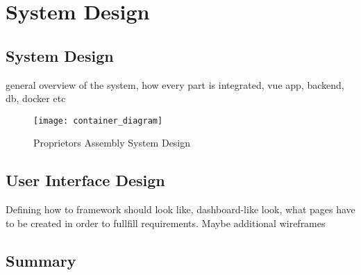 \chapter[System Design]{System Design}

\section{System Design}
general overview of the system, how every part is integrated, vue app, backend, db, docker etc

\begin{figure}[H]
    \begin{center}
    \texttt{[image: container\_diagram]}
    \end{center}
    \caption{Proprietors Assembly System Design}
    \label{fig:usecases}
\end{figure}

\section{User Interface Design}
Defining how to framework should look like, dashboard-like look, what pages have to be created in order to fullfill requirements. Maybe additional wireframes

\section{Summary}